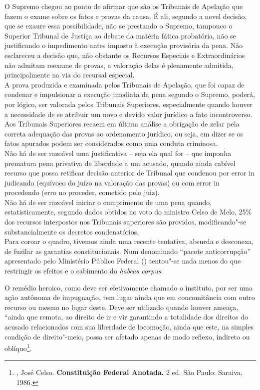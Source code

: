 O Supremo chegou ao ponto de afirmar que são os Tribunais de Apelação
que fazem o exame sobre os fatos e provas da causa. É ali, segundo a
novel decisão, que se exaure essa possibilidade, não se prestando o
Supremo, tampouco o Superior Tribunal de Justiça ao debate da matéria
fática probatória, não se justificando o impedimento antes imposto à
execução provisória da pena. Não esclareceu a decisão que, não obstante
os Recursos Especiais e Extraordinários não admitam reexame de provas, a
valoração delas é plenamente admitida, principalmente na via do recursal
especial.\\
A prova produzida e examinada pelos Tribunais de Apelação, que foi capaz
de condenar e impulsionar a execução imediata da pena segundo o Supremo,
poderá, por lógico, ser valorada pelos Tribunais Superiores,
especialmente quando houver a necessidade de se atribuir um novo e
devido valor jurídico a fato incontroverso. Aos Tribunais Superiores
recaem em última análise a obrigação de zelar pela correta adequação das
provas ao ordenamento jurídico, ou seja, em dizer se os fatos apurados
podem ser considerados como uma conduta criminosa.~\\
Não há de ser razoável uma justificativa -- seja ela qual for -- que
imponha prematura pena privativa de liberdade a um acusado, quando ainda
cabível recurso que possa retificar decisão anterior de Tribunal que
condenou por error in judicando (equívoco do juízo na valoração das
provas) ou com error in procedendo (erro no proceder, cometido pelo
juiz).\\
Não há de ser razoável iniciar o cumprimento de uma pena quando,
estatisticamente, segundo dados obtidos no voto do ministro Celso de
Melo, 25\% dos recursos interpostos nos Tribunais superiores são
providos, modificando"-se substancialmente os decretos condenatórios.\\
Para coroar o quadro, tivemos ainda uma recente tentativa, absurda e
desconexa, de fuzilar as garantias constitucionais. Num denominado
``pacote anticorrupção'' apresentado pelo Ministério Público Federal
() tentou"-se nada menos do que restringir os efeitos e o cabimento do
\emph{habeas corpus}.

O remédio heroico, como deve ser efetivamente chamado o instituto, por
ser uma ação autônoma de impugnação, tem lugar ainda que em
concomitância com outro recurso ou mesmo no lugar deste. Deve ser
utilizado quando houver ameaça, ``ainda que remota, ao direito de ir e
vir garantindo a totalidade dos direitos do acusado relacionados com sua
liberdade de locomoção, ainda que este, na simples condição de
direito"-meio, possa ser afetado apenas de modo reflexo, indireto ou
oblíquo\footnote{ , José Celso. \textbf{Constituição Federal
  Anotada.} 2 ed. São Paulo: Saraiva, 1986.}.

